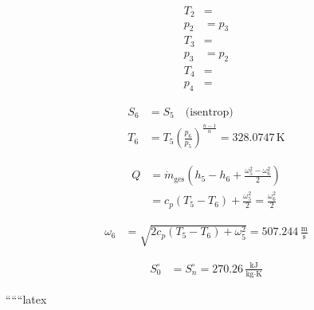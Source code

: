\begin{align*}
    T_2 &= \\
    p_2 &= p_3 \\
    T_3 &= \\
    p_3 &= p_2 \\
    T_4 &= \\
    p_4 &= 
\end{align*}

\begin{align*}
    S_6 &= S_5 \quad \text{(isentrop)} \\
    T_6 &= T_5 \left( \frac{p_6}{p_5} \right)^{\frac{n-1}{n}} = 328.0747 \, \text{K}
\end{align*}

\begin{align*}
    Q &= \dot{m}_{\text{ges}} \left( h_5 - h_6 + \frac{\omega_5^2 - \omega_6^2}{2} \right) \\
    &= c_p (T_5 - T_6) + \frac{\omega_5^2}{2} = \frac{\omega_6^2}{2}
\end{align*}

\begin{align*}
    \omega_6 &= \sqrt{2 c_p (T_5 - T_6) + \omega_5^2} = 507.244 \, \frac{\text{m}}{\text{s}}
\end{align*}

\begin{align*}
    S_0^\circ &= S_n^\circ = 270.26 \, \frac{\text{kJ}}{\text{kg} \cdot \text{K}}
\end{align*}

``````latex


